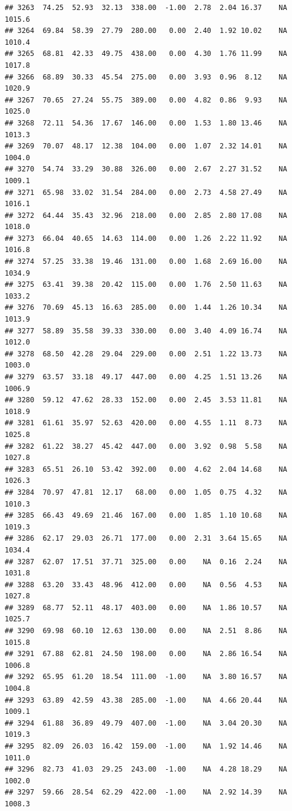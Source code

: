 \documentclass{article}\usepackage{graphicx, color}
\makeatletter
\newenvironment{kframe}{%
 \def\at@end@of@kframe{}%
 \ifinner\ifhmode%
  \def\at@end@of@kframe{\end{minipage}}%
  \begin{minipage}{\columnwidth}%
 \fi\fi%
 \def\FrameCommand##1{\hskip\@totalleftmargin \hskip-\fboxsep
 \colorbox{shadecolor}{##1}\hskip-\fboxsep
     \hskip-\linewidth \hskip-\@totalleftmargin \hskip\columnwidth}%
 \MakeFramed {\advance\hsize-\width
   \@totalleftmargin\z@ \linewidth\hsize
   \@setminipage}}%
 {\par\unskip\endMakeFramed%
 \at@end@of@kframe}
\newenvironment{knitrout}{}{} %
\makeatother
\begin{document}
\begin{knitrout}
\begin{kframe}
\begin{verbatim}
## 3263  74.25  52.93  32.13  338.00  -1.00  2.78  2.04 16.37    NA 1015.6
## 3264  69.84  58.39  27.79  280.00   0.00  2.40  1.92 10.02    NA 1010.4
## 3265  68.81  42.33  49.75  438.00   0.00  4.30  1.76 11.99    NA 1017.8
## 3266  68.89  30.33  45.54  275.00   0.00  3.93  0.96  8.12    NA 1020.9
## 3267  70.65  27.24  55.75  389.00   0.00  4.82  0.86  9.93    NA 1025.0
## 3268  72.11  54.36  17.67  146.00   0.00  1.53  1.80 13.46    NA 1013.3
## 3269  70.07  48.17  12.38  104.00   0.00  1.07  2.32 14.01    NA 1004.0
## 3270  54.74  33.29  30.88  326.00   0.00  2.67  2.27 31.52    NA 1009.1
## 3271  65.98  33.02  31.54  284.00   0.00  2.73  4.58 27.49    NA 1016.1
## 3272  64.44  35.43  32.96  218.00   0.00  2.85  2.80 17.08    NA 1018.0
## 3273  66.04  40.65  14.63  114.00   0.00  1.26  2.22 11.92    NA 1016.8
## 3274  57.25  33.38  19.46  131.00   0.00  1.68  2.69 16.00    NA 1034.9
## 3275  63.41  39.38  20.42  115.00   0.00  1.76  2.50 11.63    NA 1033.2
## 3276  70.69  45.13  16.63  285.00   0.00  1.44  1.26 10.34    NA 1013.9
## 3277  58.89  35.58  39.33  330.00   0.00  3.40  4.09 16.74    NA 1012.0
## 3278  68.50  42.28  29.04  229.00   0.00  2.51  1.22 13.73    NA 1003.0
## 3279  63.57  33.18  49.17  447.00   0.00  4.25  1.51 13.26    NA 1006.9
## 3280  59.12  47.62  28.33  152.00   0.00  2.45  3.53 11.81    NA 1018.9
## 3281  61.61  35.97  52.63  420.00   0.00  4.55  1.11  8.73    NA 1025.8
## 3282  61.22  38.27  45.42  447.00   0.00  3.92  0.98  5.58    NA 1027.8
## 3283  65.51  26.10  53.42  392.00   0.00  4.62  2.04 14.68    NA 1026.3
## 3284  70.97  47.81  12.17   68.00   0.00  1.05  0.75  4.32    NA 1010.3
## 3285  66.43  49.69  21.46  167.00   0.00  1.85  1.10 10.68    NA 1019.3
## 3286  62.17  29.03  26.71  177.00   0.00  2.31  3.64 15.65    NA 1034.4
## 3287  62.07  17.51  37.71  325.00   0.00    NA  0.16  2.24    NA 1031.8
## 3288  63.20  33.43  48.96  412.00   0.00    NA  0.56  4.53    NA 1027.8
## 3289  68.77  52.11  48.17  403.00   0.00    NA  1.86 10.57    NA 1025.7
## 3290  69.98  60.10  12.63  130.00   0.00    NA  2.51  8.86    NA 1015.8
## 3291  67.88  62.81  24.50  198.00   0.00    NA  2.86 16.54    NA 1006.8
## 3292  65.95  61.20  18.54  111.00  -1.00    NA  3.80 16.57    NA 1004.8
## 3293  63.89  42.59  43.38  285.00  -1.00    NA  4.66 20.44    NA 1009.1
## 3294  61.88  36.89  49.79  407.00  -1.00    NA  3.04 20.30    NA 1019.3
## 3295  82.09  26.03  16.42  159.00  -1.00    NA  1.92 14.46    NA 1011.0
## 3296  82.73  41.03  29.25  243.00  -1.00    NA  4.28 18.29    NA 1002.0
## 3297  59.66  28.54  62.29  422.00  -1.00    NA  2.92 14.39    NA 1008.3

\end{verbatim}
\end{kframe}
\end{knitrout}
\end{document}
